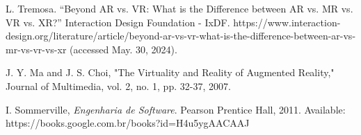 \documentclass[conference]{IEEEtran}
\begin{document}
\begin{thebibliography}{00}
  L. Tremosa. “Beyond AR vs. VR: What is the Difference between AR vs. MR vs. VR vs. XR?” Interaction Design Foundation - IxDF. https://www.interaction-design.org/literature/article/beyond-ar-vs-vr-what-is-the-difference-between-ar-vs-mr-vs-vr-vs-xr (accessed May. 30, 2024).

  J. Y. Ma and J. S. Choi, "The Virtuality and Reality of Augmented Reality," Journal of Multimedia, vol. 2, no. 1, pp. 32-37, 2007.

  I. Sommerville, \emph{Engenharia de Software}. Pearson Prentice Hall, 2011. Available: https://books.google.com.br/books?id=H4u5ygAACAAJ

\end{thebibliography}
\end{document}
